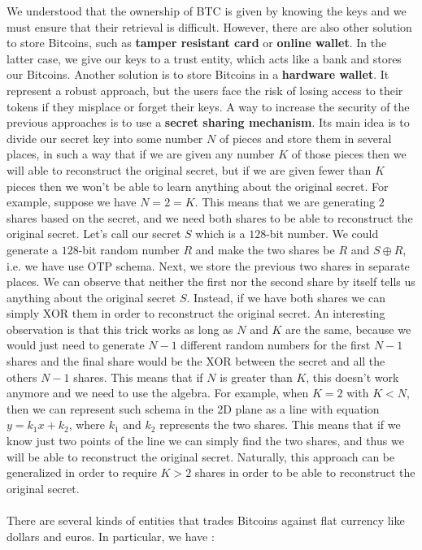 We understood that the ownership of BTC is given by knowing the keys and we must ensure that their retrieval is difficult. However, there are also other solution to store Bitcoins, such as \textbf{tamper resistant card} or \textbf{online wallet}. In the latter case, we give our keys to a trust entity, which acts like a bank and stores our Bitcoins. Another solution is to store Bitcoins in a \textbf{hardware wallet}. It represent a robust approach, but the users face the risk of losing access to their tokens if they misplace or forget their keys. A way to increase the security of the previous approaches is to use a \textbf{secret sharing mechanism}. Its main idea is to divide our secret key into some number $N$ of pieces and store them in several places, in such a way that if we are given any number $K$ of those pieces then we will able to reconstruct the original secret, but if we are given fewer than $K$ pieces then we won't be able to learn anything about the original secret. For example, suppose we have $N = 2 = K$. This means that we are generating $2$ shares based on the secret, and we need both shares to be able to reconstruct the original secret. Let's call our secret $S$ which is a $128$-bit number. We could generate a $128$-bit random number $R$ and make the two shares be $R$ and $S \oplus R$, i.e. we have use OTP schema. Next, we store the previous two shares in separate places. We can observe that neither the first nor the second share by itself tells us anything about the original secret $S$. Instead, if we have both shares we can simply XOR them in order to reconstruct the original secret. An interesting observation is that this trick works as long as $N$ and $K$ are the same, because we would just need to generate $N - 1$ different random numbers for the first $N - 1$ shares and the final share would be the XOR between the secret and all the others $N - 1$ shares. This means that if $N$ is greater than $K$, this doesn't work anymore and we need to use the algebra. For example, when $K = 2$ with $K < N$, then we can represent such schema in the 2D plane as a line with equation $y = k_{1}x + k_{2}$, where $k_{1}$ and $k_{2}$ represents the two shares. This means that if we know just two points of the line we can simply find the two shares, and thus we will be able to reconstruct the original secret. Naturally, this approach can be generalized in order to require $K > 2$ shares in order to be able to reconstruct the original secret.\\\\There are several kinds of entities that trades Bitcoins against flat currency like dollars and euros. In particular, we have :
